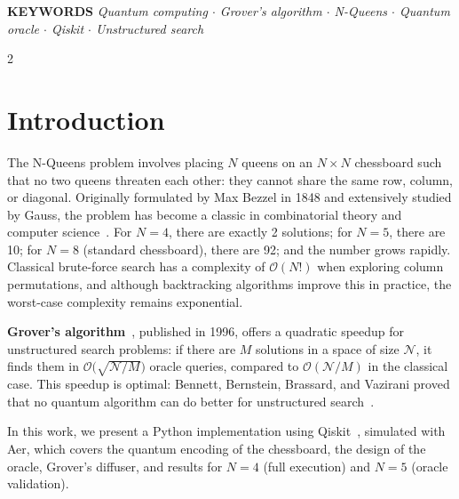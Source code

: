 \documentclass[9pt, a4paper]{extarticle}
\newcommand{\BigO}{\mathcal{O}}
\begin{document}
\vspace{0.01cm}
\noindent
\colorbox{boxbg}{%
\begin{minipage}{\dimexpr\textwidth-2\fboxsep\relax}
\vspace{2pt}
{\small\sffamily\bfseries\color{accent} KEYWORDS}\quad
{\small\itshape
Quantum computing $\cdot$ Grover's algorithm $\cdot$ N-Queens $\cdot$
Quantum oracle $\cdot$ Qiskit $\cdot$ Unstructured search}
\vspace{2pt}
\end{minipage}}

\vspace{0.07cm}

\begin{multicols}{2}
\raggedcolumns

\section{Introduction}

The N-Queens problem involves placing $N$ queens on an $N \times N$
chessboard such that no two queens threaten each other: they cannot share the
same row, column, or diagonal. Originally formulated by Max Bezzel in 1848 and
extensively studied by Gauss, the problem has become a classic in combinatorial
theory and computer science~\cite{nqueens}.
For $N = 4$, there are exactly 2 solutions; for $N = 5$, there are 10;
for $N = 8$ (standard chessboard), there are 92; and the number grows rapidly.
Classical brute-force search has a complexity of $\BigO(N!)$ when exploring
column permutations, and although backtracking algorithms improve this in practice,
the worst-case complexity remains exponential.

\textbf{Grover's algorithm}~\cite{grover1996}, published in 1996, offers a quadratic
speedup for unstructured search problems: if there are $M$ solutions in a space of
size $\mathcal{N}$, it finds them in $\BigO\!\big(\sqrt{\mathcal{N}/M}\big)$
oracle queries, compared to $\BigO(\mathcal{N}/M)$ in the classical case. This
speedup is optimal: Bennett, Bernstein, Brassard, and Vazirani proved that no
quantum algorithm can do better for unstructured search~\cite{bennett1997}.

In this work, we present a Python implementation using Qiskit~\cite{qiskit},
simulated with Aer, which covers the quantum encoding of the chessboard, the
design of the oracle, Grover's diffuser, and results for $N = 4$ (full execution)
and $N = 5$ (oracle validation).


\end{multicols}
\end{document}
